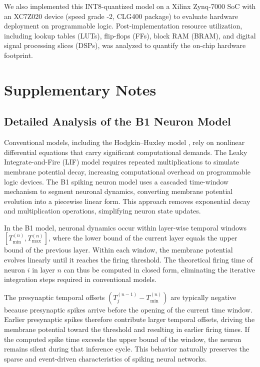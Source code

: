 \documentclass[12pt]{article}
\begin{document}
We also implemented this INT8-quantized model on a Xilinx Zynq-7000 SoC with an XC7Z020 device (speed grade -2, CLG400 package) to evaluate hardware deployment on programmable logic. Post-implementation resource utilization, including lookup tables (LUTs), flip-flops (FFs), block RAM (BRAM), and digital signal processing slices (DSPs), was analyzed to quantify the on-chip hardware footprint.
\section{Supplementary Notes}

\subsection{Detailed Analysis of the B1 Neuron Model}

Conventional models, including the Hodgkin–Huxley model \cite{ref43}, rely on nonlinear differential equations that carry significant computational demands. The Leaky Integrate-and-Fire (LIF) model requires repeated multiplications to simulate membrane potential decay, increasing computational overhead on programmable logic devices. The B1 spiking neuron model uses a cascaded time-window mechanism to segment neuronal dynamics, converting membrane potential evolution into a piecewise linear form. This approach removes exponential decay and multiplication operations, simplifying neuron state updates.

In the B1 model, neuronal dynamics occur within layer-wise temporal windows $[T_{\min}^{(n)},T_{\max}^{(n)}]$, where the lower bound of the current layer equals the upper bound of the previous layer. Within each window, the membrane potential evolves linearly until it reaches the firing threshold. The theoretical firing time of neuron $i$ in layer $n$ can thus be computed in closed form, eliminating the iterative integration steps required in conventional models.

The presynaptic temporal offsets $(T_j^{(n-1)}-T_{\min}^{(n)})$ are typically negative because presynaptic spikes arrive before the opening of the current time window. Earlier presynaptic spikes therefore contribute larger temporal offsets, driving the membrane potential toward the threshold and resulting in earlier firing times. If the computed spike time exceeds the upper bound of the window, the neuron remains silent during that inference cycle. This behavior naturally preserves the sparse and event-driven characteristics of spiking neural networks.
\end{document}

